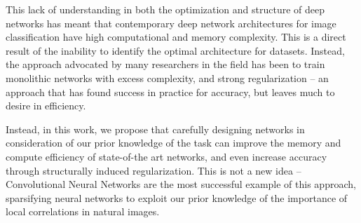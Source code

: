 \documentclass[thesis]{subfiles}
\begin{document}
This lack of understanding in both the optimization and structure of deep networks has meant that contemporary deep network architectures for image classification have high computational and memory complexity. This is a direct result of the inability to identify the optimal architecture for datasets. Instead, the approach advocated by many researchers in the field has been to train monolithic networks with excess complexity, and strong regularization -- an approach that has found success in practice for accuracy, but leaves much to desire in efficiency.


Instead, in this work, we propose that carefully designing networks in consideration of our prior knowledge of the task can improve the memory and compute efficiency of state-of-the art networks, and even increase accuracy through structurally induced regularization. This is not a new idea -- Convolutional Neural Networks are the most successful example of this approach, sparsifying neural networks to exploit our prior knowledge of the importance of local correlations in natural images.
\end{document}
